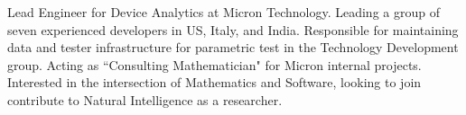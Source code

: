

\begin{cvparagraph}

\vspace{1mm}
Lead Engineer for Device Analytics at Micron Technology. Leading a group of seven experienced developers in US, Italy, and India. Responsible for maintaining data and tester infrastructure for parametric test in the Technology Development group. Acting as ``Consulting Mathematician" for Micron internal projects. Interested in the intersection of Mathematics and Software, looking to join contribute to Natural Intelligence as a researcher.
\end{cvparagraph}
